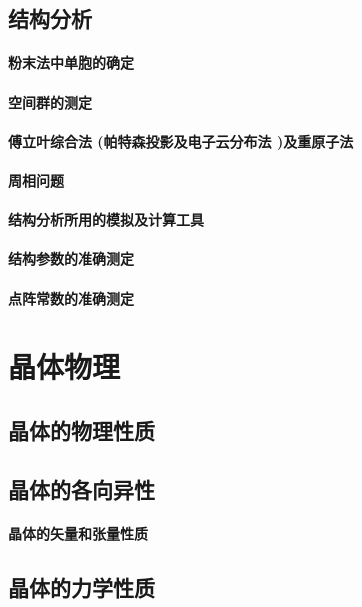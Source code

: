 \documentclass[UTF8]{../NatureUniverse}
\begin{document}
\section{结构分析}
    \subsubsection{粉末法中单胞的确定}
    \subsubsection{空间群的测定}
    \subsubsection{傅立叶综合法 (帕特森投影及电子云分布法 )及重原子法}
    \subsubsection{周相问题}
    \subsubsection{结构分析所用的模拟及计算工具}
    \subsubsection{结构参数的准确测定}
    \subsubsection{点阵常数的准确测定}







\chapter{晶体物理}
\section{晶体的物理性质}
\section{晶体的各向异性}
    \subsubsection{晶体的矢量和张量性质}
\section{晶体的力学性质}
\end{document}
